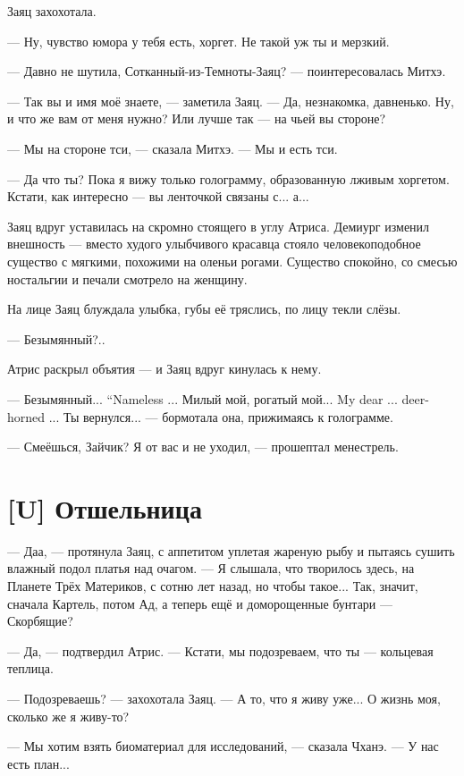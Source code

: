 Заяц захохотала.

--- Ну, чувство юмора у тебя есть, хоргет.
Не такой уж ты и мерзкий.

--- Давно не шутила, Сотканный-из-Темноты-Заяц? --- поинтересовалась Митхэ.

--- Так вы и имя моё знаете, --- заметила Заяц.
--- Да, незнакомка, давненько.
Ну, и что же вам от меня нужно?
Или лучше так --- на чьей вы стороне?

--- Мы на стороне тси, --- сказала Митхэ.
--- Мы и есть тси.

--- Да что ты?
Пока я вижу только голограмму, образованную лживым хоргетом.
Кстати, как интересно --- вы ленточкой связаны с... а...

Заяц вдруг уставилась на скромно стоящего в углу Атриса.
Демиург изменил внешность --- вместо худого улыбчивого красавца стояло человекоподобное существо с мягкими, похожими на оленьи рогами.
Существо спокойно, со смесью ностальгии и печали смотрело на женщину.

На лице Заяц блуждала улыбка, губы её тряслись, по лицу текли слёзы.

--- Безымянный?..

Атрис раскрыл объятия --- и Заяц вдруг кинулась к нему.

{--- Безымянный...}
{``Nameless ...}
{Милый мой, рогатый мой...}
{My dear ... deer-horned ...}
Ты вернулся... --- бормотала она, прижимаясь к голограмме.

--- Смеёшься, Зайчик?
Я от вас и не уходил, --- прошептал менестрель.

\section{[U] Отшельница}

--- Даа, --- протянула Заяц, с аппетитом уплетая жареную рыбу и пытаясь сушить влажный подол платья над очагом.
--- Я слышала, что творилось здесь, на Планете Трёх Материков, с сотню лет назад, но чтобы такое...
Так, значит, сначала Картель, потом Ад, а теперь ещё и доморощенные бунтари --- Скорбящие?

--- Да, --- подтвердил Атрис.
--- Кстати, мы подозреваем, что ты --- кольцевая теплица.

--- Подозреваешь? --- захохотала Заяц.
--- А то, что я живу уже...
О жизнь моя, сколько же я живу-то?

--- Мы хотим взять биоматериал для исследований, --- сказала Чханэ.
--- У нас есть план...


